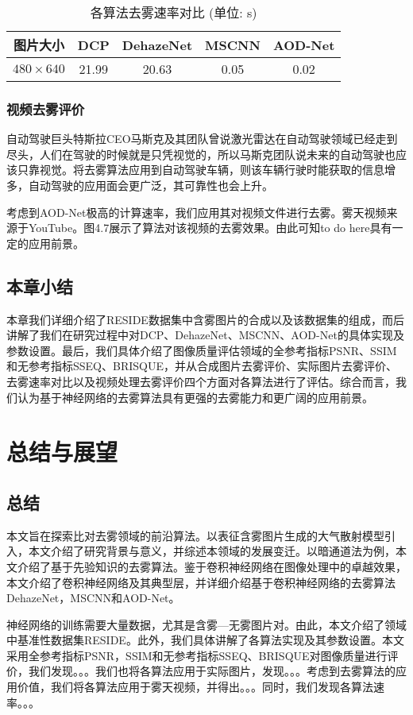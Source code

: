 \documentclass[a4paper, 12pt, oneside]{report}
\begin{document}
{\begin{table}[htbp]
\centering
\caption{各算法去雾速率对比 (单位: s)}
\begin{tabular}{c|c|c|c|c}
\hline
图片大小 & DCP & DehazeNet	& MSCNN	& AOD-Net \\
\hline
$480\times  640$ & 21.99 & 20.63 & 0.05 & 0.02\\
\hline
\end{tabular}
\label{tab: 4.3}
\end{table}

\subsection{视频去雾评价\quad}
自动驾驶巨头特斯拉CEO马斯克及其团队曾说激光雷达在自动驾驶领域已经走到尽头，人们在驾驶的时候就是只凭视觉的，所以马斯克团队说未来的自动驾驶也应该只靠视觉。将去雾算法应用到自动驾驶车辆，则该车辆行驶时能获取的信息增多，自动驾驶的应用面会更广泛，其可靠性也会上升。

考虑到AOD-Net极高的计算速率，我们应用其对视频文件进行去雾。雾天视频来源于YouTube\cite{ref27}。图4.7展示了算法对该视频的去雾效果。由此可知to do here具有一定的应用前景。

\section{本章小结\quad}
本章我们详细介绍了RESIDE数据集中含雾图片的合成以及该数据集的组成，而后讲解了我们在研究过程中对DCP、DehazeNet、MSCNN、AOD-Net的具体实现及参数设置。最后，我们具体介绍了图像质量评估领域的全参考指标PSNR、SSIM和无参考指标SSEQ、BRISQUE，并从合成图片去雾评价、实际图片去雾评价、去雾速率对比以及视频处理去雾评价四个方面对各算法进行了评估。综合而言，我们认为基于神经网络的去雾算法具有更强的去雾能力和更广阔的应用前景。

\chapter{总结与展望\quad}
\section{总结\quad}
本文旨在探索比对去雾领域的前沿算法。以表征含雾图片生成的大气散射模型引入，本文介绍了研究背景与意义，并综述本领域的发展变迁。以暗通道法为例，本文介绍了基于先验知识的去雾算法。鉴于卷积神经网络在图像处理中的卓越效果，本文介绍了卷积神经网络及其典型层，并详细介绍基于卷积神经网络的去雾算法DehazeNet，MSCNN和AOD-Net。

神经网络的训练需要大量数据，尤其是含雾—无雾图片对。由此，本文介绍了领域中基准性数据集RESIDE。此外，我们具体讲解了各算法实现及其参数设置。本文采用全参考指标PSNR，SSIM和无参考指标SSEQ、BRISQUE对图像质量进行评价，我们发现。。。我们也将各算法应用于实际图片，发现。。。考虑到去雾算法的应用价值，我们将各算法应用于雾天视频，并得出。。。同时，我们发现各算法速率。。。
	
}
\end{document}
